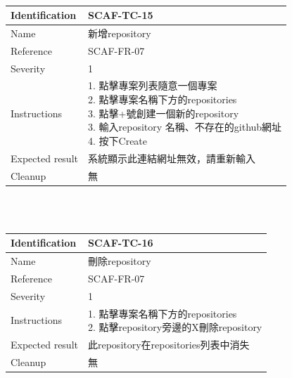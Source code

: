 \documentclass{report}
\begin{document}
\newline
\\
\begin{tabularx}{\textwidth}{
  |p{}%
  |p{}|%
  }
  \hline
  \centering Identification &  SCAF-TC-15 \\
  \hline
  \centering Name & 新增repository \\
  \hline
  \centering Reference & SCAF-FR-07 \\
  \hline
  \centering Severity & 1 \\
  \hline
  \centering Instructions & 
  \makecell[l]{
    1. 點擊專案列表隨意一個專案 \\
    2. 點擊專案名稱下方的repositories \\
    3. 點擊+號創建一個新的repository \\
    3. 輸入repository 名稱、不存在的github網址  \\
    4. 按下Create
  }\\
  \hline
  \centering Expected result & 系統顯示此連結網址無效，請重新輸入 \\
  \hline
  \centering Cleanup & 無 \\
  \hline
\end{tabularx}
\\
\newline
\\
\begin{tabularx}{\textwidth}{
  |p{}%
  |p{}|%
  }
  \hline
  \centering Identification &  SCAF-TC-16 \\
  \hline
  \centering Name & 刪除repository \\
  \hline
  \centering Reference & SCAF-FR-07 \\
  \hline
  \centering Severity & 1 \\
  \hline
  \centering Instructions & 
  \makecell[l]{
    1. 點擊專案名稱下方的repositories \\
    2. 點擊repository旁邊的X刪除repository \\
  }\\
  \hline
  \centering Expected result & 此repository在repositories列表中消失 \\
  \hline
  \centering Cleanup & 無 \\
  \hline
\end{tabularx}
\\
\end{document}
